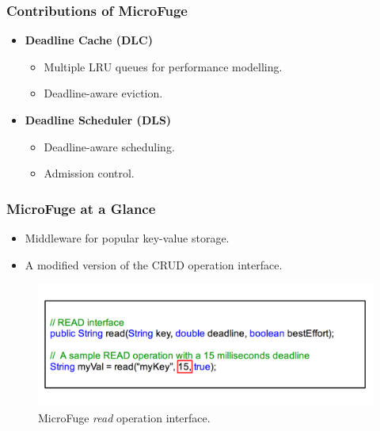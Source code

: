 \documentclass{beamer}
\newcommand{\myv}{\vspace{3 mm}}
\begin{document}
\begin{frame}
  \frametitle{Contributions of MicroFuge}
  \vspace{-10 mm}
  \begin{itemize}
  \item \textbf{Deadline Cache (DLC)}
    \myv
    \begin{itemize}
      \item Multiple LRU queues for performance modelling.
        \myv
      \item Deadline-aware eviction.
    \end{itemize}
    \myv
  \item \textbf{Deadline Scheduler (DLS)}
    \myv
    \begin{itemize}
      \item Deadline-aware scheduling.
        \myv
      \item Admission control.
    \end{itemize}
  \end{itemize}
\end {frame}



\begin{frame}
  \frametitle{MicroFuge at a Glance}
  \begin{itemize}
  \item Middleware for popular key-value storage.
    \myv
  \item A modified version of the CRUD operation interface.
  \end{itemize}
  \begin{figure}
\vspace{-5 mm}
  \includegraphics[scale=0.25]{img/MicroFuge_protocol.png}
  \caption{MicroFuge \textit{read} operation interface.}
  \end{figure}
\end{frame}
\end{document}

